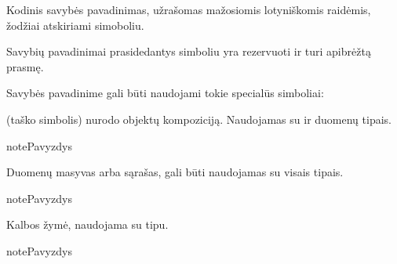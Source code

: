 \documentclass[letterpaper,10pt,lithuanian]{sphinxmanual}
\begin{document}
\begin{fulllineitems}
\label{\detokenize{formatas:property}}
\pysigstartsignatures
{}
\pysigstopsignatures
\sphinxAtStartPar
{}

\sphinxAtStartPar
Kodinis savybės pavadinimas, užrašomas mažosiomis lotyniškomis raidėmis,
žodžiai atskiriami \sphinxcode{\sphinxupquote{\_}} simoboliu.

\sphinxAtStartPar
Savybių pavadinimai prasidedantys \sphinxcode{\sphinxupquote{\_}} simboliu yra rezervuoti ir turi
apibrėžtą prasmę.

\sphinxAtStartPar
Savybės pavadinime gali būti naudojami tokie specialūs simboliai:
\begin{description}
\sphinxAtStartPar
(taško simbolis) nurodo objektų kompoziciją. Naudojamas su
{\hyperref[\detokenize{tipai:type.ref}]{}} ir {\hyperref[\detokenize{tipai:type.object}]{}} duomenų tipais.

\begin{sphinxadmonition}{note}{Pavyzdys}

\begin{DUlineblock}{0em}
\item[] 
\end{DUlineblock}
\end{sphinxadmonition}

\sphinxlineitem{{[}{]}}
\sphinxAtStartPar
Duomenų masyvas arba sąrašas, gali būti naudojamas su visais tipais.

\begin{sphinxadmonition}{note}{Pavyzdys}

\begin{DUlineblock}{0em}
\item[] 
\end{DUlineblock}
\end{sphinxadmonition}

\end{description}
\begin{description}
\sphinxAtStartPar
Kalbos žymė, naudojama su {\hyperref[\detokenize{tipai:type.text}]{}} tipu.

\begin{sphinxadmonition}{note}{Pavyzdys}


\end{sphinxadmonition}
\end{description}
\end{fulllineitems}
\end{document}
